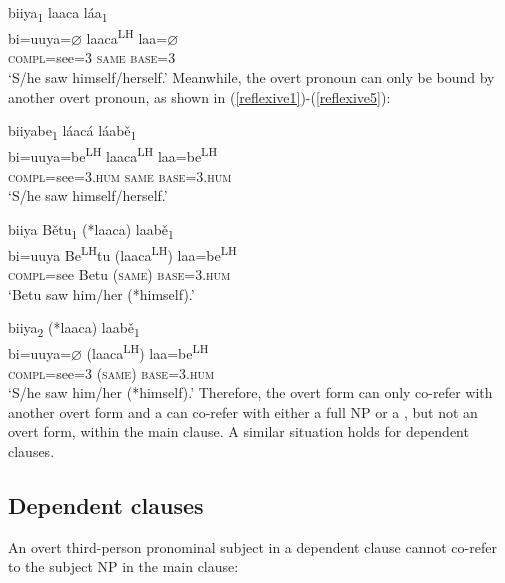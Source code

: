 \ea\label{reflexive2} 
\glll biiya\textsubscript{1} laaca l\'{a}a\textsubscript{1} \\
bi=uuya={$\varnothing$} laaca\textsuperscript{LH} laa={$\varnothing$} \\
\textsc{compl}=see=\textsc{3} \textsc{same} \textsc{base}=\textsc{3} \\
\glt `S/he saw himself/herself.'
\z
Meanwhile, the overt pronoun can only be bound by another overt pronoun, as shown in (\ref{reflexive1})-(\ref{reflexive5}):

\ea\label{reflexive1}
\glll biiyabe\textsubscript{1} l\'{a}ac\'{a} l\'{a}ab\v{e}\textsubscript{1} \\
bi=uuya=be\textsuperscript{LH}  laaca\textsuperscript{LH} laa=be\textsuperscript{LH}  \\
\textsc{compl}=see=\textsc{3.hum} \textsc{same} \textsc{base}=\textsc{3.hum} \\
\glt `S/he saw himself/herself.'
\z

\ea\label{reflexive4}
\glll biiya B\v{e}tu\textsubscript{1} (*laaca) laab\v{e}\textsubscript{1} \\
bi=uuya Be\textsuperscript{LH}tu (laaca\textsuperscript{LH}) laa=be\textsuperscript{LH}  \\
\textsc{compl}=see Betu (\textsc{same}) \textsc{base}=\textsc{3.hum} \\
\glt `Betu saw him/her (*himself).'
\z

\ea\label{reflexive5}
\glll biiya\textsubscript{2} (*laaca) laab\v{e}\textsubscript{1} \\
bi=uuya={$\varnothing$} (laaca\textsuperscript{LH}) laa=be\textsuperscript{LH}  \\
\textsc{compl}=see=\textsc{3} (\textsc{same}) \textsc{base}=\textsc{3.hum} \\
\glt `S/he saw him/her (*himself).'
\z
Therefore, the overt form can only co-refer with another overt form and a  can co-refer with either a full NP or a , but not an overt form, within the main clause. A similar situation holds for dependent clauses.


\subsection{Dependent clauses}

An overt third-person pronominal subject in a dependent clause cannot co-refer to the subject NP in the main clause:

